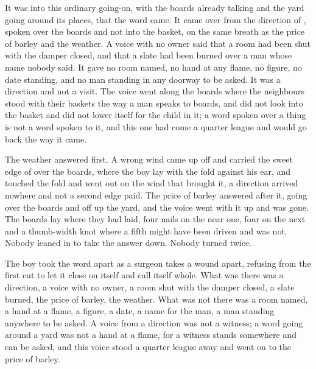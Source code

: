 \scenebreak

It was into this ordinary going-on, with the boards already talking and the yard going around its places, that the word came. It came over  from the direction of , spoken over the boards and not into the basket, on the same breath as the price of barley and the weather. A voice with no owner said that a room had been shut with the damper closed, and that a slate had been burned over a man whose name nobody said. It gave no room named, no hand at any flame, no figure, no date standing, and no man standing in any doorway to be asked. It was a direction and not a visit. The voice went along the boards where the neighbours stood with their baskets the way a man speaks to boards, and did not look into the basket and did not lower itself for the child in it; a word spoken over a thing is not a word spoken to it, and this one had come a quarter league and would go back the way it came.

The weather answered first. A wrong wind came up off  and carried the sweet edge of  over the boards, where the boy lay with the fold against his ear, and touched the fold and went out on the wind that brought it, a direction arrived nowhere and not a second edge paid. The price of barley answered after it, going over the boards and off up the yard, and the voice went with it up  and was gone. The boards lay where they had laid, four nails on the near one, four on the next and a thumb-width knot where a fifth might have been driven and was not. Nobody leaned in to take the answer down. Nobody turned twice.

The boy took the word apart as a surgeon takes a wound apart, refusing from the first cut to let it close on itself and call itself whole. What was there was a direction, a voice with no owner, a room shut with the damper closed, a slate burned, the price of barley, the weather. What was not there was a room named, a hand at a flame, a figure, a date, a name for the man, a man standing anywhere to be asked. A voice from a direction was not a witness; a word going around a yard was not a hand at a flame, for a witness stands somewhere and can be asked, and this voice stood a quarter league away and went on to the price of barley.

